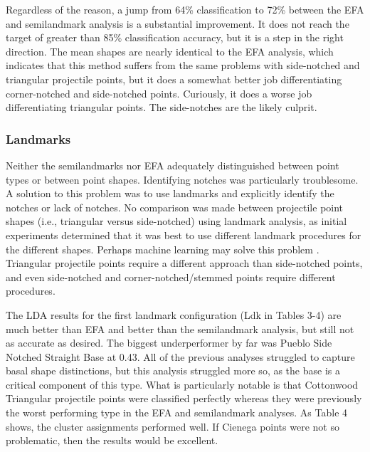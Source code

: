 \documentclass[letterpaper]{article}
\begin{document}
Regardless of the reason, a jump from 64\% classification to 72\% between the EFA and semilandmark analysis is a substantial improvement. It does not reach the target of greater than 85\% classification accuracy, but it is a step in the right direction. The mean shapes are nearly identical to the EFA analysis, which indicates that this method suffers from the same problems with side-notched and triangular projectile points, but it does a somewhat better job differentiating corner-notched and side-notched points. Curiously, it does a worse job differentiating triangular points. The side-notches are the likely culprit.

\hypertarget{landmarks}{%
\subsubsection*{Landmarks}\label{landmarks}}

Neither the semilandmarks nor EFA adequately distinguished between point types or between point shapes. Identifying notches was particularly troublesome. A solution to this problem was to use landmarks and explicitly identify the notches or lack of notches. No comparison was made between projectile point shapes (i.e., triangular versus side-notched) using landmark analysis, as initial experiments determined that it was best to use different landmark procedures for the different shapes. Perhaps machine learning may solve this problem \autocites[see][]{Castillo_Flores2019-cs,MacLeod2018-aj,Nash2016-mc}. Triangular projectile points require a different approach than side-notched points, and even side-notched and corner-notched/stemmed points require different procedures.

The LDA results for the first landmark configuration (Ldk in Tables 3-4) are much better than EFA and better than the semilandmark analysis, but still not as accurate as desired. The biggest underperformer by far was Pueblo Side Notched Straight Base at 0.43. All of the previous analyses struggled to capture basal shape distinctions, but this analysis struggled more so, as the base is a critical component of this type. What is particularly notable is that Cottonwood Triangular projectile points were classified perfectly whereas they were previously the worst performing type in the EFA and semilandmark analyses. As Table 4 shows, the cluster assignments performed well. If Cienega points were not so problematic, then the results would be excellent.
\end{document}
